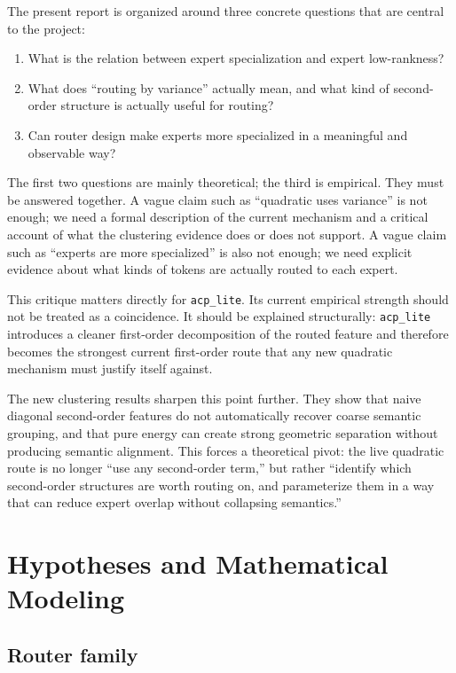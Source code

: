 \documentclass[11pt]{article}
\begin{document}
The present report is organized around three concrete questions that are central to the project:
\begin{enumerate}
    \item What is the relation between expert specialization and expert low-rankness?
    \item What does ``routing by variance'' actually mean, and what kind of second-order structure is actually useful for routing?
    \item Can router design make experts more specialized in a meaningful and observable way?
\end{enumerate}

The first two questions are mainly theoretical; the third is empirical. They must be answered together. A vague claim such as ``quadratic uses variance'' is not enough; we need a formal description of the current mechanism and a critical account of what the clustering evidence does or does not support. A vague claim such as ``experts are more specialized'' is also not enough; we need explicit evidence about what kinds of tokens are actually routed to each expert.

This critique matters directly for \texttt{acp\_lite}. Its current empirical strength should not be treated as a coincidence. It should be explained structurally: \texttt{acp\_lite} introduces a cleaner first-order decomposition of the routed feature and therefore becomes the strongest current first-order route that any new quadratic mechanism must justify itself against.

The new clustering results sharpen this point further. They show that naive diagonal second-order features do not automatically recover coarse semantic grouping, and that pure energy can create strong geometric separation without producing semantic alignment. This forces a theoretical pivot: the live quadratic route is no longer ``use any second-order term,'' but rather ``identify which second-order structures are worth routing on, and parameterize them in a way that can reduce expert overlap without collapsing semantics.''

\section{Hypotheses and Mathematical Modeling}

\subsection{Router family}
\end{document}
